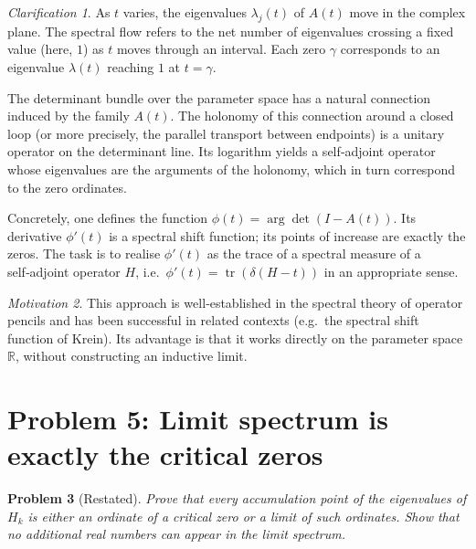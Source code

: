 \documentclass[11pt,a4paper]{article}
\newtheorem{problem}{Problem}[section]
\theoremstyle{remark}
\newtheorem{clarification}[problem]{Clarification}
\newtheorem{motivation}[problem]{Motivation}
\newcommand{\bbR}{\mathbb{R}}
\DeclareMathOperator{\tr}{tr}
\begin{document}
\begin{clarification}
As $t$ varies, the eigenvalues $\lambda_j(t)$ of $A(t)$ move in the complex plane. The spectral flow refers to the net number of eigenvalues crossing a fixed value (here, $1$) as $t$ moves through an interval. Each zero $\gamma$ corresponds to an eigenvalue $\lambda(t)$ reaching $1$ at $t=\gamma$.

The determinant bundle over the parameter space has a natural connection induced by the family $A(t)$. The holonomy of this connection around a closed loop (or more precisely, the parallel transport between endpoints) is a unitary operator on the determinant line. Its logarithm yields a self‑adjoint operator whose eigenvalues are the arguments of the holonomy, which in turn correspond to the zero ordinates.

Concretely, one defines the function $\phi(t) = \arg\det(I-A(t))$. Its derivative $\phi'(t)$ is a spectral shift function; its points of increase are exactly the zeros. The task is to realise $\phi'(t)$ as the trace of a spectral measure of a self‑adjoint operator $H$, i.e.\ $\phi'(t) = \tr(\delta(H-t))$ in an appropriate sense.
\end{clarification}

\begin{motivation}
This approach is well‑established in the spectral theory of operator pencils and has been successful in related contexts (e.g.\ the spectral shift function of Krein). Its advantage is that it works directly on the parameter space $\bbR$, without constructing an inductive limit.
\end{motivation}

\section{Problem 5: Limit spectrum is exactly the critical zeros}

\begin{problem}[Restated]
Prove that every accumulation point of the eigenvalues of $H_k$ is either an ordinate of a critical zero or a limit of such ordinates. Show that no additional real numbers can appear in the limit spectrum.
\end{problem}
\end{document}
